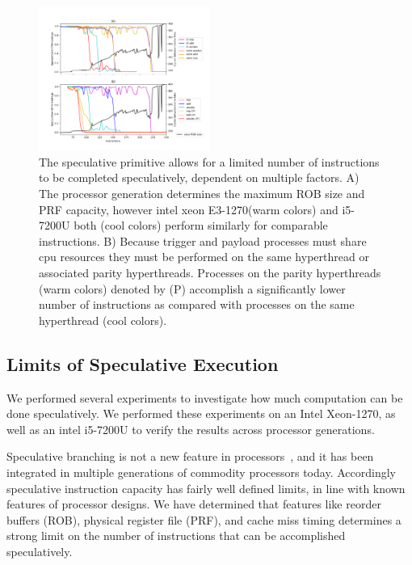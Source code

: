 \begin{figure}[t]
    \centering
        \includegraphics[width=0.5\textwidth]{figures/speculative_measurements.png}
    \caption{The speculative primitive allows for a limited number of instructions
        to be completed speculatively, dependent on multiple factors. A) The 
        processor generation determines the maximum ROB size and PRF capacity,
        however intel xeon E3-1270(warm colors) and i5-7200U both (cool colors) 
        perform similarly for comparable instructions. B) Because trigger and 
        payload processes must share cpu resources they must be performed on 
        the same hyperthread or associated parity hyperthreads. Processes on
        the parity hyperthreads (warm colors) denoted by (P) accomplish a 
        significantly lower number of instructions as compared with processes 
        on the same hyperthread (cool colors).}
    \label{fig:spec-capacity}
\end{figure}

\subsection{Limits of Speculative Execution}
We performed several experiments to investigate how much computation can be done
speculatively. We performed these experiments on an Intel Xeon-1270, as well as 
an intel i5-7200U to verify the results across processor generations. 

Speculative branching is not a new feature in processors~\cite{branching-hist}, 
and it has been integrated in multiple generations of commodity processors today. 
Accordingly speculative instruction capacity has fairly well defined limits, in 
line with known features of processor designs. We have determined that features 
like reorder buffers (ROB), physical register file (PRF), and cache miss timing
determines a strong limit on the number of instructions that can be accomplished
speculatively. 

